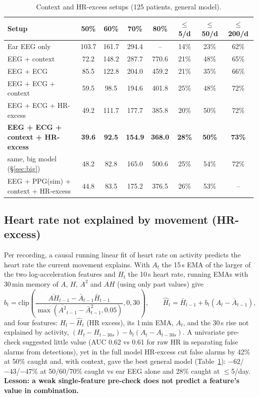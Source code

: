 \begin{table}[H]
\centering\small
\caption{Context and HR-excess setups (125 patients, general model).}
\label{tab:ctx}
\begin{tabular}{@{}lccccccc@{}}
\toprule
Setup & 50\% & 60\% & 70\% & 80\% & $\le$5/d & $\le$50/d & $\le$200/d \\
\midrule
Ear EEG only & 103.7 & 161.7 & 294.4 & -- & 14\% & 23\% & 62\% \\
EEG + context & 72.2 & 148.2 & 287.7 & 770.6 & 21\% & 48\% & 65\% \\
EEG + ECG & 85.5 & 122.8 & 204.0 & 459.2 & 21\% & 35\% & 66\% \\
EEG + ECG + context & 59.5 & 98.5 & 194.6 & 401.8 & 25\% & 48\% & 72\% \\
EEG + ECG + HR-excess & 49.2 & 111.7 & 177.7 & 385.8 & 20\% & 50\% & 72\% \\
\textbf{EEG + ECG + context + HR-excess} & \textbf{39.6} & \textbf{92.5} & \textbf{154.9} & \textbf{368.0} & \textbf{28\%} & \textbf{50\%} & \textbf{73\%} \\
same, big model (\S\ref{sec:big}) & 48.2 & 82.8 & 165.0 & 500.6 & 25\% & 54\% & 72\% \\
EEG + PPG(sim) + context + HR-excess & 44.8 & 83.5 & 175.2 & 376.5 & 26\% & 53\% & -- \\
\bottomrule
\end{tabular}
\end{table}

\subsection{Heart rate not explained by movement (HR-excess)}

Per recording, a causal running linear fit of heart rate on activity predicts the heart rate the current movement explains. With $A_t$ the 15\,s EMA of the larger of the two log-acceleration features and $H_t$ the 10\,s heart rate, running EMAs with 30\,min memory of $A$, $H$, $A^2$ and $AH$ (using only past values) give
\begin{equation}
b_t = \mathrm{clip}\!\left(\frac{\overline{AH}_{t-1}-\bar A_{t-1}\bar H_{t-1}}{\max(\overline{A^2}_{t-1}-\bar A^2_{t-1},0.05)},0,30\right),\qquad
\hat H_t = \bar H_{t-1} + b_t(A_t - \bar A_{t-1}),
\end{equation}
and four features: $H_t-\hat H_t$ (HR excess), its 1\,min EMA, $A_t$, and the 30\,s rise not explained by activity, $(H_t-H_{t-30s}) - b_t(A_t-A_{t-30s})$. A univariate pre-check suggested little value (AUC 0.62 vs 0.61 for raw HR in separating false alarms from detections), yet in the full model HR-excess cut false alarms by 42\% at 50\% caught and, with context, gave the best general model (Table~\ref{tab:ctx}): $-62$/$-43$/$-47$\% at 50/60/70\% caught vs ear EEG alone and 28\% caught at $\le$5/day. \textbf{Lesson: a weak single-feature pre-check does not predict a feature's value in combination.}

